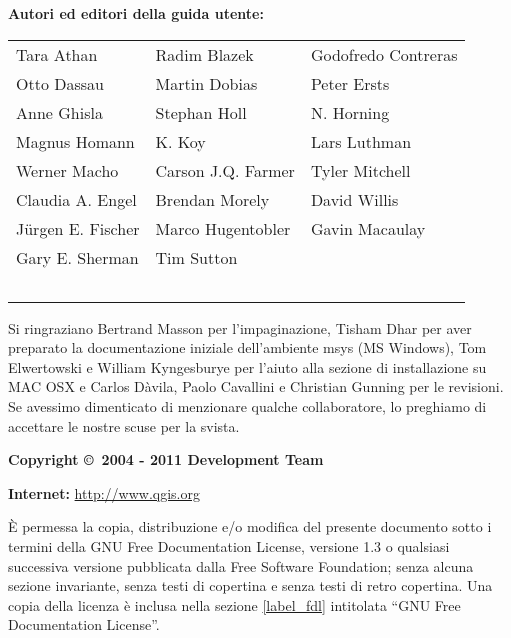 \newpage

\begin{flushleft}
\textbf{Autori ed editori della guida utente:}
  \par\bigskip\noindent
\begin{tabular}{p{4cm} p{4cm} p{4cm}}
Tara Athan & Radim Blazek & Godofredo Contreras \\
Otto Dassau & Martin Dobias & Peter Ersts \\
Anne Ghisla & Stephan Holl & N. Horning \\
Magnus Homann & K. Koy & Lars Luthman \\ 
Werner Macho & Carson J.Q. Farmer & Tyler Mitchell \\
Claudia A. Engel & Brendan Morely & David Willis \\
Jürgen E. Fischer & Marco Hugentobler & Gavin Macaulay \\
Gary E. Sherman & Tim Sutton \\ \
\end{tabular}
\end{flushleft}

Si ringraziano Bertrand Masson per l'impaginazione, Tisham Dhar per aver preparato 
la documentazione iniziale dell'ambiente msys (MS Windows), Tom Elwertowski e William 
Kyngesburye per l'aiuto alla sezione di installazione su MAC OSX e Carlos Dàvila, 
Paolo Cavallini e Christian Gunning per le revisioni. Se avessimo dimenticato di 
menzionare qualche collaboratore, lo preghiamo di accettare le nostre scuse per la svista.
\par\bigskip\noindent
\textbf{Copyright \copyright~2004 - 2011 \QG Development Team}
\par\bigskip\noindent
\textbf{Internet:} \url{http://www.qgis.org}


È permessa la copia, distribuzione e/o modifica del presente documento sotto i termini della GNU
Free Documentation License, versione 1.3 o qualsiasi successiva versione pubblicata dalla Free 
Software Foundation; senza alcuna sezione invariante, senza testi di copertina e senza testi di retro copertina. 
Una copia della licenza è inclusa nella sezione \ref{label_fdl} intitolata “GNU Free Documentation License”.

\newpage
